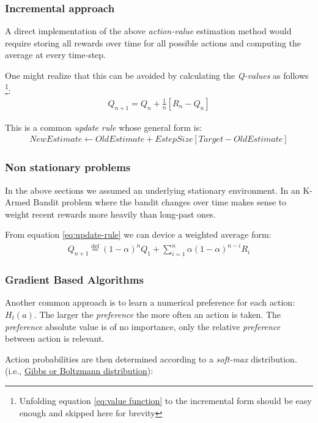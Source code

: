 \documentclass[paper=a4,fontsize=11pt]{scrartcl} %
\numberwithin{equation}{section} %
\numberwithin{figure}{section} %
\numberwithin{table}{section} %
\newcommand{\eqdef}{\stackrel{\text{def}}{=}}
\begin{document}
\subsubsection{Incremental approach}
A direct implementation of the above \textit{action-value} estimation method would require storing all rewards over
time for all possible actions and computing the average at every time-step.

One might realize that this can be avoided by calculating the \textit{Q-values} as follows 
\footnote{Unfolding equation \ref{eq:value function} to the incremental form should be easy enough and skipped here for brevity}:
\begin{align}
Q_{n+1} = Q_n + \frac{1}{n} \left[ R_n - Q_n \right]	\label{eq:update-rule}
\end{align}

This is a common \textit{update rule} whose general form is:
\begin{align*}
NewEstimate \leftarrow OldEstimate + EstepSize \left[ Target - OldEstimate \right]
\end{align*}

\subsubsection{Non stationary problems}
In the above sections we assumed an underlying stationary environment. In an K-Armed Bandit problem where 
the bandit changes over time makes sense to weight recent rewards more heavily than long-past ones.

From equation \eqref{eq:update-rule} we can device a weighted average form:
\begin{align}
Q_{n+1} \eqdef (1 - \alpha)^n Q_1 + \sum_{i=1}^n \alpha (1-\alpha)^{n-i} R_i
\end{align}


\subsubsection{Gradient Based Algorithms}
Another common approach is to learn a numerical preference for each action: $H_t(a)$.
The larger the \textit{preference} the more often an action is taken. The \textit{preference} absolute value is of no
importance, only the relative \textit{preference} between action is relevant.

Action probabilities are then determined according to a \textit{soft-max} distribution.
(i.e., \hyperlink{https://en.wikipedia.org/wiki/Boltzmann_distribution}{Gibbs or Boltzmann distribution}):
\end{document}
